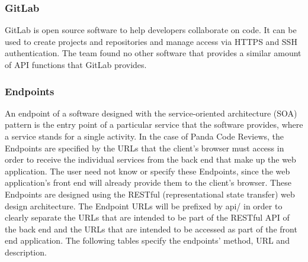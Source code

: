 \subsubsection{GitLab}

GitLab is open source software to help developers collaborate on code. It can be
used to create projects and repositories and manage access via HTTPS and SSH
authentication. The team found no other software that provides a similar amount
of API functions that GitLab provides.

\subsubsection{Endpoints}

An endpoint of a software designed with the service-oriented architecture (SOA)
pattern is the entry point of a particular service that the software provides,
where a service stands for a single activity. In the case of Panda Code Reviews,
the Endpoints are specified by the URLs that the client's browser must access in
order to receive the individual services from the back end that make up the web
application. The user need not know or specify these Endpoints, since the web
application's front end will already provide them to the client's browser. These
Endpoints are designed using the RESTful (representational state transfer) web
design architecture. The Endpoint URLs will be prefixed by api/ in order to
clearly separate the URLs that are intended to be part of the RESTful API of the
back end and the URLs that are intended to be accessed as part of the front end
application. The following tables specify the endpoints' method, URL and
description.

